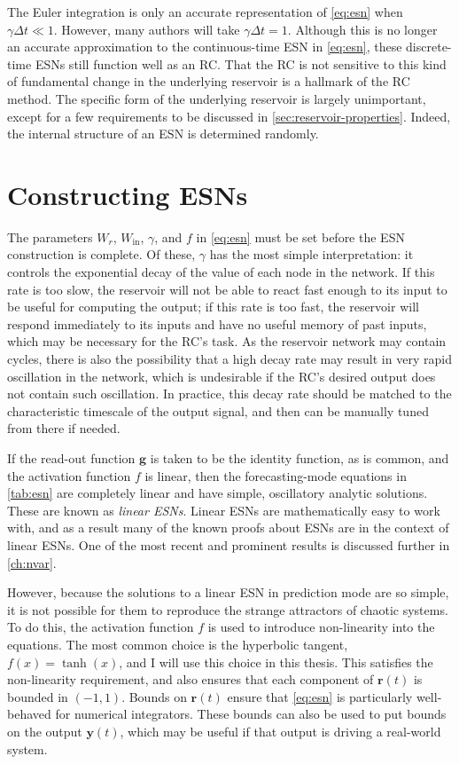 The Euler integration is only an accurate representation of
\cref{eq:esn} when $\gamma \Delta t \ll 1$. However, many authors will
take $\gamma \Delta t = 1$. Although this is no longer an accurate
approximation to the continuous-time ESN in \cref{eq:esn}, these
discrete-time ESNs still function well as an RC. That the RC is not
sensitive to this kind of fundamental change in the underlying
reservoir is a hallmark of the RC method. The specific form of the
underlying reservoir is largely unimportant, except for a few
requirements to be discussed in
\cref{sec:reservoir-properties}. Indeed, the internal structure of an
ESN is determined randomly.

\section{Constructing ESNs}\label{sec:esn-construction}

The parameters $W_r$, $W_\text{in}$, $\gamma$, and $f$ in
\cref{eq:esn} must be set before the ESN construction is complete. Of
these, $\gamma$ has the most simple interpretation: it controls the
exponential decay of the value of each node in the network. If this
rate is too slow, the reservoir will not be able to react fast enough
to its input to be useful for computing the output; if this rate is
too fast, the reservoir will respond immediately to its inputs and
have no useful memory of past inputs, which may be necessary for the
RC's task. As the reservoir network may contain cycles, there is also
the possibility that a high decay rate may result in very rapid
oscillation in the network, which is undesirable if the RC's desired
output does not contain such oscillation. In practice, this decay rate
should be matched to the characteristic timescale of the output
signal, and then can be manually tuned from there if needed.

If the read-out function $\bm{g}$ is taken to be the identity
function, as is common, and the activation function $f$ is linear,
then the forecasting-mode equations in \cref{tab:esn} are completely
linear and have simple, oscillatory analytic solutions. These are
known as \emph{linear ESNs}. Linear ESNs are mathematically easy to work
with, and as a result many of the known proofs about ESNs are in the
context of linear ESNs. One of the most recent and prominent results is
discussed further in \cref{ch:nvar}.

However, because the solutions to a linear ESN in prediction mode are
so simple, it is not possible for them to reproduce the strange
attractors of chaotic systems. To do this, the activation function $f$
is used to introduce non-linearity into the equations. The most common
choice is the hyperbolic tangent, $f(x) = \tanh(x)$, and I will use this choice
in this thesis. This satisfies the non-linearity requirement, and
also ensures that each component of $\bm{r}(t)$ is bounded in $(-1,
1)$. Bounds on $\bm{r}(t)$ ensure that \cref{eq:esn} is particularly
well-behaved for numerical integrators. These bounds can also be used
to put bounds on the output $\bm{y}(t)$, which may be useful if that
output is driving a real-world system.

